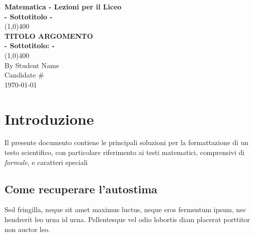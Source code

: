 \documentclass[11pt, landscape]{article}
\begin{document}
\begin{titlepage}
\begin{center}
\vspace*{1cm}
\Large{\textbf{Matematica - Lezioni per il Liceo}}\\
\large{\textbf{- Sottotitolo -}}\\
\vfill
\line(1,0){400}\\[.5mm]
\huge{\textbf{TITOLO ARGOMENTO}}\\[3mm]
\Large{\textbf{- Sottotitolo:  -}}\\[1mm]
\line(1,0){400}\\
\vfill
{\scriptsize By Student Name}\\
{\scriptsize Candidate \#} \\
{\scriptsize \today} \\

\end{center}
\end{titlepage}


\tableofcontents
\thispagestyle{empty}
\clearpage

\setcounter{page}{1}

\vspace*{1cm}
\section{Introduzione}
Il presente documento contiene le principali soluzioni per la formattazione di un testo scientifico, con particolare riferimento ai testi matematici, comprensivi di \emph{formule}, e caratteri speciali

\subsection{Come recuperare l'autostima}
Sed fringilla, neque sit amet maximus luctus, neque eros fermentum ipsum, nec hendrerit leo urna id urna. Pellentesque vel odio lobortis diam placerat porttitor non auctor leo.\\
\end{document}
